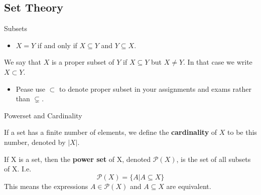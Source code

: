 \subsection{Set Theory}
\outline

\begin{frame}{Subsets}
    \begin{itemize}
        \item  $X = Y$ if and only if $X \subseteq Y$ and $Y \subseteq X$.
    \end{itemize}
    \begin{definition}
        We say that $X$ is a proper subset of $Y$ if $X \subseteq Y$ but $X \neq Y$. In that case we write $X \subset Y$.
    \end{definition}
    \begin{itemize}
        \item Pease use $\subset$ to denote proper subset in your assignments and exams rather than $\subsetneq$.
    \end{itemize}
\end{frame}

\begin{frame}{Powerset and Cardinality}
    \begin{definition}
        If a set has a finite number of elements, we define the \textbf{cardinality} of $X$ to be this number, denoted by $|X|$.
    \end{definition}
    \begin{definition}
        If X is a set, then the \textbf{power set} of X, denoted $\mathscr{P}(X)$, is the set of all subsets of X. I.e. $$\mathscr{P}(X) = \{A | A \subseteq X\}$$
        This means the expressions $A \in \mathscr{P}(X)$ and $A \subseteq X$ are equivalent.
    \end{definition}
\end{frame}

